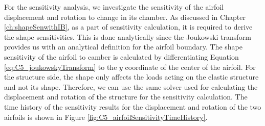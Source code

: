 %
For the sensitivity analysis, we investigate the sensitivity of the airfoil displacement and rotation to change in its chamber. As discussed in Chapter \ref{ch:shapeSenwithIB}, as a part of sensitivity calculation, it is required to derive the shape sensitivities. This is done analytically since the Joukowski transform provides us with an analytical definition for the airfoil boundary. The shape sensitivity of the airfoil to camber is calculated by differentiating Equation \eqref{eq:C5_joukowskyTransform} to the $y$ coordinate of the center of the airfoil. For the structure side, the shape only affects the loads acting on the elastic structure and not its shape. Therefore, we can use the same solver used for calculating the displacement and rotation of the structure for the sensitivity calculation. The time history of the sensitivity results for the displacement and rotation of the two airfoils is shown in Figure \ref{fig:C5_airfoilSensitivityTimeHistory}.
%
